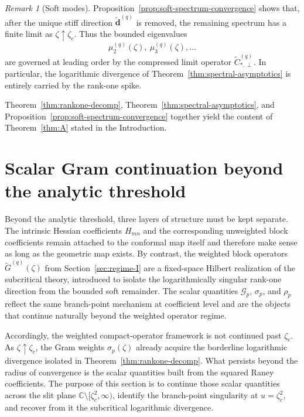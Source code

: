 \documentclass[11pt]{amsart}
\numberwithin{equation}{section}
\theoremstyle{plain}
\theoremstyle{definition}
\theoremstyle{remark}
\newtheorem{remark}[theorem]{Remark}
\newcommand{\CC}{\mathbb{C}}
\begin{document}
\begin{remark}[Soft modes]
	\label{rem:soft-modes}
	Proposition~\ref{prop:soft-spectrum-convergence} shows that, after the
	unique stiff direction $\widetilde{\bm d}^{(q)}$ is removed, the remaining
	spectrum has a finite limit as $\zeta\uparrow\zeta_c$. Thus the bounded
	eigenvalues
	\[
		\mu_2^{(q)}(\zeta),\ \mu_3^{(q)}(\zeta),\dots
	\]
	are governed at leading order by the compressed limit operator
	$\widetilde C_{*,\perp}^{(q)}$. In particular, the logarithmic divergence
	of Theorem~\ref{thm:spectral-asymptotics} is entirely carried by the
	rank-one spike.
\end{remark}

Theorem~\ref{thm:rankone-decomp}, Theorem~\ref{thm:spectral-asymptotics}, and
Proposition~\ref{prop:soft-spectrum-convergence} together yield the content of
Theorem~\ref{thm:A} stated in the Introduction.

\FloatBarrier


\section{Scalar Gram continuation beyond the analytic threshold}
\label{sec:regime-2}


Beyond the analytic threshold, three layers of structure must be kept
separate. The intrinsic Hessian coefficients \(H_{mn}\) and the corresponding
unweighted block coefficients remain attached to the conformal map itself and
therefore make sense as long as the geometric map exists. By contrast, the
weighted block operators \(\widetilde G^{(q)}(\zeta)\) from
Section~\ref{sec:regime-I} are a fixed-space Hilbert realization of the
subcritical theory, introduced to isolate the logarithmically singular rank-one
direction from the bounded soft remainder. The scalar quantities
\(\mathcal G_p\), \(\sigma_p\), and \(\rho_p\) reflect the same branch-point
mechanism at coefficient level and are the objects that continue naturally
beyond the weighted operator regime.

Accordingly, the weighted compact-operator framework is not continued past
\(\zeta_c\). As \(\zeta\uparrow\zeta_c\), the Gram weights
\(\sigma_p(\zeta)\) already acquire the borderline logarithmic divergence
isolated in Theorem~\ref{thm:rankone-decomp}. What persists beyond the radius
of convergence is the scalar quantities built from the squared Raney coefficients.
The purpose of this section is to continue those scalar quantities across the slit
plane \(\CC\setminus[\zeta_c^2,\infty)\), identify the branch-point
singularity at \(u=\zeta_c^2\), and recover from it the subcritical
logarithmic divergence.
\end{document}
